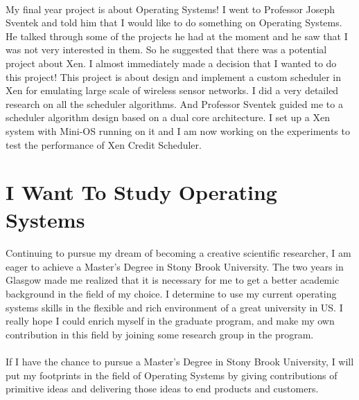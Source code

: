 \documentclass{article}
\begin{document}
\paragraph{} My final year project is about Operating Systems! I went to Professor Joseph Sventek and told him that I would like to do something on Operating Systems. He talked through some of the projects he had at the moment and he saw that I was not very interested in them. So he suggested that there was a potential project about Xen. I almost immediately made a decision that I wanted to do this project! This project is about design and implement a custom scheduler in Xen for emulating large scale of wireless sensor networks. I did a very detailed research on all the scheduler algorithms. And Professor Sventek guided me to a scheduler algorithm design based on a dual core architecture. I set up a Xen system with Mini-OS running on it and I am now working on the experiments to test the performance of Xen Credit Scheduler.

\section{I Want To Study Operating Systems}
\paragraph{} Continuing to pursue my dream of becoming a creative scientific researcher, I am eager to achieve a Master's Degree in Stony Brook University. The two years in Glasgow made me realized that it is necessary for me to get a better academic background in the field of my choice. I determine to use my current operating systems skills in the flexible and rich environment of a great university in US. I really hope I could enrich myself in the graduate program, and make my own contribution in this field by joining some research group in the program.

\paragraph{} If I have the chance to pursue a Master's Degree in Stony Brook University, I will put my footprints in the field of Operating Systems by giving contributions of primitive ideas and delivering those ideas to end products and customers.
\end{document}
